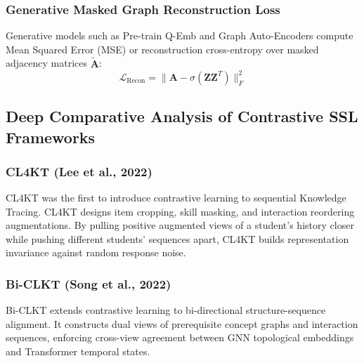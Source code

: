 \documentclass[10pt,journal,compsoc]{IEEEtran}
\begin{document}
\subsubsection{Generative Masked Graph Reconstruction Loss}
Generative models such as Pre-train Q-Emb \cite{KT026_PretrainQ_2020} and Graph Auto-Encoders compute Mean Squared Error (MSE) or reconstruction cross-entropy over masked adjacency matrices $\tilde{\mathbf{A}}$:
\begin{equation}
\mathcal{L}_{\text{Recon}} = \|\mathbf{A} - \sigma(\mathbf{Z} \mathbf{Z}^T)\|_F^2
\end{equation}

\subsection{Deep Comparative Analysis of Contrastive SSL Frameworks}

\subsubsection{CL4KT (Lee et al., 2022)}
CL4KT \cite{KT039_CL4KT_2022} was the first to introduce contrastive learning to sequential Knowledge Tracing. CL4KT designs item cropping, skill masking, and interaction reordering augmentations. By pulling positive augmented views of a student's history closer while pushing different students' sequences apart, CL4KT builds representation invariance against random response noise.

\subsubsection{Bi-CLKT (Song et al., 2022)}
Bi-CLKT \cite{KT011_BiCLKT_2022} extends contrastive learning to bi-directional structure-sequence alignment. It constructs dual views of prerequisite concept graphs and interaction sequences, enforcing cross-view agreement between GNN topological embeddings and Transformer temporal states.
\end{document}
